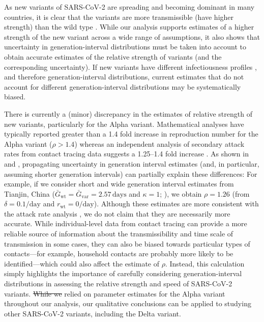 \documentclass[12pt]{article}
\newcommand{\vvvar}{\mathrm{var}}
\newcommand{\wwwt}{\mathrm{wt}}
\newcommand{\rx}[1]{\ensuremath{{r}_{#1}}\xspace}
\newcommand{\rw}{\rx{\wwwt}}
\newcommand{\days}{\ensuremath{\, \textrm{days}}}
\newcommand{\pday}{\ensuremath{/\textrm{day}}}
\newcommand{\Gx}[1]{\ensuremath{{\bar G}_{#1}}\xspace}
\newcommand{\Gw}{\Gx{\wwwt}}
\newcommand{\Gv}{\Gx{\vvvar}}
\providecommand{\DIFaddtex}[1]{{\protect\color{blue}\uwave{#1}}} %
\providecommand{\DIFdeltex}[1]{{\protect\color{red}\sout{#1}}}                      %
\providecommand{\DIFaddbegin}{} %
\providecommand{\DIFaddend}{} %
\providecommand{\DIFdelbegin}{} %
\providecommand{\DIFdelend}{} %
\providecommand{\DIFadd}[1]{\texorpdfstring{\DIFaddtex{#1}}{#1}} %
\providecommand{\DIFdel}[1]{\texorpdfstring{\DIFdeltex{#1}}{}} %
\newcommand{\DIFscaledelfig}{0.5}
\newlength{\DIFdelgraphicswidth} %
\newlength{\DIFdelgraphicsheight} %
\newcommand{\DIFaddincludegraphics}[2][]{{\color{blue}\fbox{\DIFOincludegraphics[#1]{#2}}}} %
\newcommand{\DIFdelincludegraphics}[2][]{%
\sbox{\DIFdelgraphicsbox}{\DIFOincludegraphics[#1]{#2}}%
\settoboxwidth{\DIFdelgraphicswidth}{\DIFdelgraphicsbox} %
\settoboxtotalheight{\DIFdelgraphicsheight}{\DIFdelgraphicsbox} %
\scalebox{\DIFscaledelfig}{%
\parbox[b]{\DIFdelgraphicswidth}{\usebox{\DIFdelgraphicsbox}\\[-\baselineskip] \rule{\DIFdelgraphicswidth}{0em}}\llap{\resizebox{\DIFdelgraphicswidth}{\DIFdelgraphicsheight}{%
\setlength{\unitlength}{\DIFdelgraphicswidth}%
\begin{picture}(1,1)%
\thicklines\linethickness{2pt} %
{\color[rgb]{1,0,0}\put(0,0){\framebox(1,1){}}}%
{\color[rgb]{1,0,0}\put(0,0){\line( 1,1){1}}}%
{\color[rgb]{1,0,0}\put(0,1){\line(1,-1){1}}}%
\end{picture}%
}\hspace*{3pt}}} %
} %
\DeclareRobustCommand{\DIFaddbegin}{\DIFOaddbegin \let\includegraphics\DIFaddincludegraphics} %
\DeclareRobustCommand{\DIFaddend}{\DIFOaddend \let\includegraphics\DIFOincludegraphics} %
\DeclareRobustCommand{\DIFdelbegin}{\DIFOdelbegin \let\includegraphics\DIFdelincludegraphics} %
\DeclareRobustCommand{\DIFdelend}{\DIFOaddend \let\includegraphics\DIFOincludegraphics} %
\begin{document}
As new variants of SARS-CoV-2 are spreading and becoming dominant in many countries, it is clear that the variants are more transmissible (have higher strength) than the wild type \citep{switzerland2021variant, davies2021estimated, di2021impact, graham2021changes, leung2021early, volz2021transmission,zhao2021}.
While our analysis supports estimates of a higher strength of the new variant across a wide range of assumptions, it also shows that uncertainty in generation-interval distributions must be taken into account to obtain accurate estimates of the relative strength of variants (and the corresponding uncertainty).
If new variants have different infectiousness profiles \citep{kissler2021densely,li2021viral,zhang2021transmission}, and therefore generation-interval distributions, current estimates that do not account for different generation-interval distributions may be systematically biased.

There is currently a (minor) discrepancy in the estimates of relative strength of new variants, particularly for the Alpha variant.
Mathematical analyses have typically reported greater than a 1.4 fold increase in reproduction number for the Alpha variant ($\rho > 1.4$) whereas an independent analysis of secondary attack rates from contact tracing data suggests a 1.25--1.4 fold increase \citep{ukinvest}.
As shown in \cite{davies2021estimated} and \cite{volz2021transmission}, propagating uncertainty in generation interval estimates (and, in particular, assuming shorter generation intervals) can partially explain these differences:
For example, if we consider short and wide generation interval estimates from Tianjin, China ($\Gw=\Gv=2.57\days$ and $\kappa=1$; \cite{ganyani2020estimating}), we obtain $\rho=1.26$ (from $\delta=0.1\pday$ and $\rw = 0\pday$).
Although these estimates are more consistent with the attack rate analysis \citep{ukinvest},
we do not claim that they are necessarily more accurate.
While individual-level data from contact tracing can provide a more reliable source of information about the transmissibility and time scale of transmission in some cases, they can also be biased towards particular types of contacts---for example, household contacts are probably more likely to be identified---which could also affect the estimate of $\rho$.
Instead, this calculation simply highlights the importance of carefully considering generation-interval distributions in assessing the relative strength and speed of SARS-CoV-2 variants.
\DIFdelbegin \DIFdel{While we }\DIFdelend \DIFaddbegin \DIFadd{We }\DIFaddend relied on parameter estimates for the Alpha variant throughout our analysis, \DIFaddbegin \DIFadd{but }\DIFaddend our qualitative conclusions can be applied to studying other SARS-CoV-2 variants, including the Delta variant.
\end{document}
